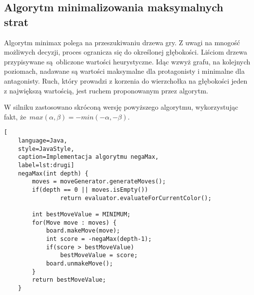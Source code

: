 \subsection{Algorytm minimalizowania maksymalnych strat}
\label{subsec:algorytm-minimalizowania-maksymalnych-strat}

Algorytm minimax polega na przeszukiwaniu drzewa gry.
Z uwagi na mnogość możliwych decyzji, proces ogranicza się do określonej głębokości.
Liściom drzewa przypisywane są~obliczone wartości heurystyczne.
Idąc wzwyż grafu, na kolejnych poziomach, nadawane są wartości maksymalne dla protagonisty i minimalne dla antagonisty.
Ruch, który prowadzi z korzenia do wierzchołka na głębokości jeden z największą wartością, jest ruchem proponowanym przez algorytm.

W silniku zastosowano skróconą wersję powyższego algorytmu, wykorzystując fakt, że~$max(\alpha, \beta) = -min(-\alpha, -\beta)$.

\begin{lstlisting}[
    language=Java,
    style=JavaStyle,
    caption=Implementacja algorytmu negaMax,
    label=lst:drugi]
    negaMax(int depth) {
        moves = moveGenerator.generateMoves();
        if(depth == 0 || moves.isEmpty())
                return evaluator.evaluateForCurrentColor();

        int bestMoveValue = MINIMUM;
        for(Move move : moves) {
            board.makeMove(move);
            int score = -negaMax(depth-1);
            if(score > bestMoveValue)
                bestMoveValue = score;
            board.unmakeMove();
        }
        return bestMoveValue;
    }
\end{lstlisting}


